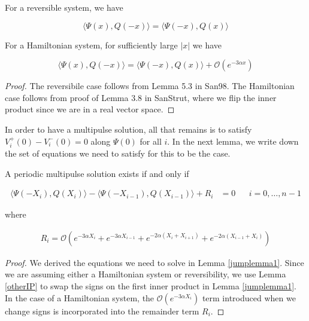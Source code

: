\documentclass[thesis.tex]{subfiles}
\begin{document}

\begin{lemma}\label{otherIP}

For a reversible system, we have

\begin{equation}
\langle \Psi(x), Q(-x) \rangle = \langle \Psi(-x), Q(x) \rangle
\end{equation}

For a Hamiltonian system, for sufficiently large $|x|$ we have

\begin{equation}
\langle \Psi(x), Q(-x) \rangle = \langle \Psi(-x), Q(x) \rangle
+ \mathcal{O}(e^{-3 \alpha x})
\end{equation}

\begin{proof}
The reversibile case follows from Lemma 5.3 in San98. The Hamiltonian case follows from proof of Lemma 3.8 in SanStrut, where we flip the inner product since we are in a real vector space. 
\end{proof}
\end{lemma}

In order to have a multipulse solution, all that remains is to satisfy $V_i^+(0) - V_i^-(0) = 0$ along $\Psi(0)$ for all $i$. In the next lemma, we write down the set of equations we need to satisfy for this to be the case.

\begin{lemma}\label{IPsystem}
A periodic multipulse solution exists if and only if 

\begin{align}\label{jumpIPdiff}
\langle \Psi(-X_i), Q(X_i) \rangle - \langle \Psi(-X_{i-1}), Q(X_{i-1}) \rangle + R_i &= 0 && i = 0, \dots, n-1
\end{align}

where 

\begin{align*}
R_i = \mathcal{O} ( e^{-3 \alpha X_i} +  e^{-3 \alpha X_{i-1}}
+ e^{-2 \alpha (X_i + X_{i+1})} + e^{-2 \alpha (X_{i-1} + X_i)})
\end{align*}

\begin{proof}
We derived the equations we need to solve in Lemma \ref{jumplemma1}. Since we are assuming either a Hamiltonian system or reversibility, we use Lemma \ref{otherIP} to swap the signs on the first inner product in Lemma \ref{jumplemma1}. In the case of a Hamiltonian system, the $\mathcal{O}(e^{-3 \alpha X_i})$ term introduced when we change signs is incorporated into the remainder term $R_i$.
\end{proof}
\end{lemma}
\end{document}
